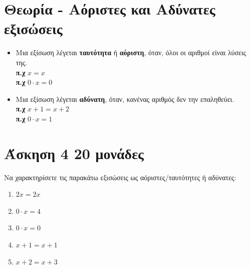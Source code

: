 \documentclass[a4paper,10pt]{report}
\begin{document}
\section*{Θεωρία - Αόριστες και Αδύνατες εξισώσεις \hfill \small{}}
\begin{itemize}
 \item Μια εξίσωση λέγεται \textbf{ταυτότητα} ή \textbf{αόριστη}, όταν, όλοι οι αριθμοί είναι λύσεις της. \\
\textbf{π.χ} $x=x$\\
\textbf{π.χ} $0\cdot x=0$
 \item Μια εξίσωση λέγεται \textbf{αδύνατη}, όταν, κανένας αριθμός δεν την επαληθεύει. \\
\textbf{π.χ} $x+1=x+2$\\
\textbf{π.χ} $0\cdot x=1$
\end{itemize}


\section*{Άσκηση 4  \hfill \small{20 μονάδες}}
Να χαρακτηρίσετε τις παρακάτω εξισώσεις ως αόριστες/ταυτότητες ή αδύνατες: 
\begin{enumerate}
 \item $2x=2x$
 \item $0\cdot x=4$
 \item $0\cdot x=0$
 \item $x+1=x+1$
 \item $x+2=x+3$
\end{enumerate}
\end{document}
